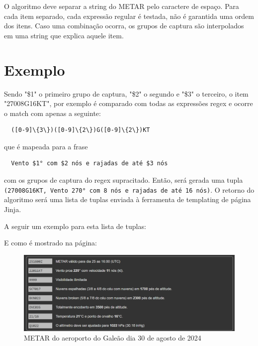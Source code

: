 O algoritmo deve separar a string do METAR pelo caractere de espaço. Para cada 
item separado, cada expressão regular é testada, não é garantida uma ordem dos itens.
 Caso uma combinação ocorra, os grupos de captura são interpolados em uma string 
 que explica aquele item. 

\section{Exemplo}

Sendo "\$1" o primeiro grupo de captura, "\$2" o segundo e "\$3" o terceiro, o item "27008G16KT", 
por exemplo é comparado com todas as expressões regex e ocorre o match com apenas a seguinte:

\begin{verbatim}
  ([0-9]\{3\})([0-9]\{2\})G([0-9]\{2\})KT
\end{verbatim}

que é mapeada para a frase

\begin{verbatim}
  Vento $1° com $2 nós e rajadas de até $3 nós
\end{verbatim}

com os grupos de captura do regex supracitado. Então, será gerada uma tupla
\texttt{(27008G16KT, Vento 270° com 8 nós e rajadas de até 16 nós)}. O retorno do 
algoritmo será uma lista de tuplas enviada à ferramenta de templating
de página Jinja.

A seguir um exemplo para esta lista de tuplas:



E como é mostrado na página:

\begin{figure}[ht]
  \begin{center}
  \includegraphics[width=400pt]{img/metar-sbgl.png}
  \caption{METAR do aeroporto do Galeão dia 30 de agosto de 2024}
  \label{fig:metar-30-08}
  \end{center}
\end{figure}
